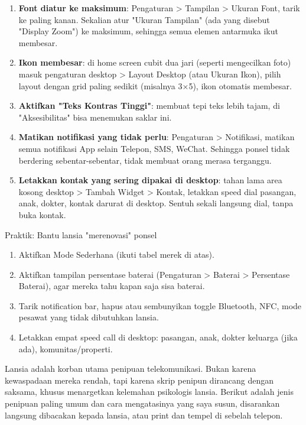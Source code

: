 \begin{enumerate}
  \item \textbf{Font diatur ke maksimum}: Pengaturan > Tampilan > Ukuran Font, tarik ke paling kanan. Sekalian atur "Ukuran Tampilan" (ada yang disebut "Display Zoom") ke maksimum, sehingga semua elemen antarmuka ikut membesar.
  \item \textbf{Ikon membesar}: di home screen cubit dua jari (seperti mengecilkan foto) masuk pengaturan desktop > Layout Desktop (atau Ukuran Ikon), pilih layout dengan grid paling sedikit (misalnya 3×5), ikon otomatis membesar.
  \item \textbf{Aktifkan "Teks Kontras Tinggi"}: membuat tepi teks lebih tajam, di "Aksesibilitas" bisa menemukan saklar ini.
  \item \textbf{Matikan notifikasi yang tidak perlu}: Pengaturan > Notifikasi, matikan semua notifikasi App selain Telepon, SMS, WeChat. Sehingga ponsel tidak berdering sebentar-sebentar, tidak membuat orang merasa terganggu.
  \item \textbf{Letakkan kontak yang sering dipakai di desktop}: tahan lama area kosong desktop > Tambah Widget > Kontak, letakkan speed dial pasangan, anak, dokter, kontak darurat di desktop. Sentuh sekali langsung dial, tanpa buka kontak.
\end{enumerate}

\begin{tcbpractice}{Praktik: Bantu lansia "merenovasi" ponsel}
\begin{enumerate}
  \item Aktifkan Mode Sederhana (ikuti tabel merek di atas).
  \item Aktifkan tampilan persentase baterai (Pengaturan > Baterai > Persentase Baterai), agar mereka tahu kapan saja sisa baterai.
  \item Tarik notification bar, hapus atau sembunyikan toggle Bluetooth, NFC, mode pesawat yang tidak dibutuhkan lansia.
  \item Letakkan empat speed call di desktop: pasangan, anak, dokter keluarga (jika ada), komunitas/properti.
\end{enumerate}

\end{tcbpractice}


Lansia adalah korban utama penipuan telekomunikasi. Bukan karena kewaspadaan mereka rendah, tapi karena skrip penipun dirancang dengan saksama, khusus menargetkan kelemahan psikologis lansia. Berikut adalah jenis penipuan paling umum dan cara mengatasinya yang saya susun, disarankan langsung dibacakan kepada lansia, atau print dan tempel di sebelah telepon.

